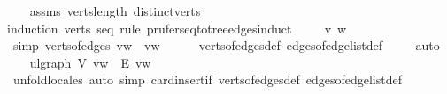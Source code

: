 \begin{isabellebody}
%
\isadelimproof
\ \ %
\endisadelimproof
%
\isatagproof
{}\isamarkupfalse%
\ assms\ verts{\isacharunderscore}{\kern0pt}length\ distinct{\isacharunderscore}{\kern0pt}verts\isanewline
{}\isamarkupfalse%
{\isacharparenleft}{\kern0pt}induction\ verts\ seq\ rule{\isacharcolon}{\kern0pt}\ prufer{\isacharunderscore}{\kern0pt}seq{\isacharunderscore}{\kern0pt}to{\isacharunderscore}{\kern0pt}tree{\isacharunderscore}{\kern0pt}edges{\isachardot}{\kern0pt}induct{\isacharparenright}{\kern0pt}\isanewline
\ \ \isamarkupfalse%
\ {\isacharparenleft}{\kern0pt}{}\ v\ w{\isacharparenright}{\kern0pt}\isanewline
\ \ \isamarkupfalse%
\ {\isacharbrackleft}{\kern0pt}simp{\isacharbrackright}{\kern0pt}{\isacharcolon}{\kern0pt}\ {\isachardoublequoteopen}verts{\isacharunderscore}{\kern0pt}of{\isacharunderscore}{\kern0pt}edges\ {\isacharbrackleft}{\kern0pt}{\isacharparenleft}{\kern0pt}v{\isacharcomma}{\kern0pt}w{\isacharparenright}{\kern0pt}{\isacharbrackright}{\kern0pt}\ {\isacharequal}{\kern0pt}\ {\isacharbraceleft}{\kern0pt}v{\isacharcomma}{\kern0pt}w{\isacharbraceright}{\kern0pt}{\isachardoublequoteclose}\isanewline
\ \ \ \ \isamarkupfalse%
\ verts{\isacharunderscore}{\kern0pt}of{\isacharunderscore}{\kern0pt}edges{\isacharunderscore}{\kern0pt}def\ edges{\isacharunderscore}{\kern0pt}of{\isacharunderscore}{\kern0pt}edge{\isacharunderscore}{\kern0pt}list{\isacharunderscore}{\kern0pt}def\ \isamarkupfalse%
\ {}\ \isamarkupfalse%
\ auto\isanewline
\isanewline
\ \ \isamarkupfalse%
\ ulgraph\ {\isachardoublequoteopen}{\isacharquery}{\kern0pt}V\ {\isacharbrackleft}{\kern0pt}v{\isacharcomma}{\kern0pt}w{\isacharbrackright}{\kern0pt}\ {\isacharbrackleft}{\kern0pt}{\isacharbrackright}{\kern0pt}{\isachardoublequoteclose}\ {\isachardoublequoteopen}{\isacharquery}{\kern0pt}E\ {\isacharbrackleft}{\kern0pt}v{\isacharcomma}{\kern0pt}w{\isacharbrackright}{\kern0pt}\ {\isacharbrackleft}{\kern0pt}{\isacharbrackright}{\kern0pt}{\isachardoublequoteclose}\isanewline
\ \ \ \ \isamarkupfalse%
\ {\isacharparenleft}{\kern0pt}unfold{\isacharunderscore}{\kern0pt}locales{\isacharcomma}{\kern0pt}\ auto\ simp{\isacharcolon}{\kern0pt}\ card{\isacharunderscore}{\kern0pt}insert{\isacharunderscore}{\kern0pt}if\ verts{\isacharunderscore}{\kern0pt}of{\isacharunderscore}{\kern0pt}edges{\isacharunderscore}{\kern0pt}def\ edges{\isacharunderscore}{\kern0pt}of{\isacharunderscore}{\kern0pt}edge{\isacharunderscore}{\kern0pt}list{\isacharunderscore}{\kern0pt}def{\isacharparenright}{\kern0pt}\isanewline

\end{isabellebody}
